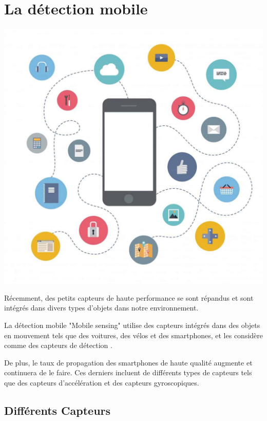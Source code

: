 
\chapter{La détection mobile}

\label{chapitre2}
		
		\includegraphics [width=1 \linewidth, height=0.8\textheight, keepaspectratio] {Images/chapterFigures/chTwo.png}
		
	
		
		\newpage

Récemment, des petits capteurs de haute performance se sont répandus et sont intégrés dans divers types d'objets dans notre environnement.

La détection mobile "Mobile sensing" utilise des capteurs intégrés dans des objets en mouvement tels que des voitures, des vélos et des smartphones, et les considère comme des capteurs de détection \cite{nomuraMethodEstimatingRoad2015}.

De plus, le taux de propagation des smartphones de haute qualité augmente et continuera de le faire. Ces derniers incluent de différents types de capteurs tels que des capteurs d'accélération et des capteurs gyroscopiques.



\section{Différents Capteurs}

